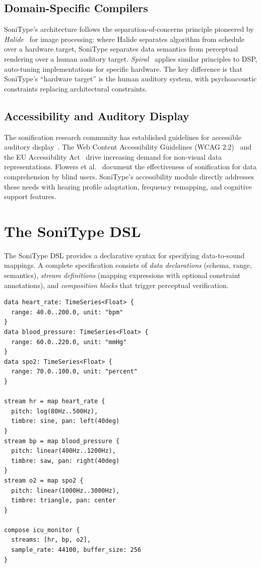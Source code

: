 \documentclass[sigchi, nonacm]{acmart}
\begin{document}
\subsection{Domain-Specific Compilers}

SoniType's architecture follows the separation-of-concerns principle pioneered by \emph{Halide}~\cite{ragan2013halide} for image processing: where Halide separates algorithm from schedule over a hardware target, SoniType separates data semantics from perceptual rendering over a human auditory target. \emph{Spiral}~\cite{puschel2005spiral} applies similar principles to DSP, auto-tuning implementations for specific hardware. The key difference is that SoniType's ``hardware target'' is the human auditory system, with psychoacoustic constraints replacing architectural constraints.

\subsection{Accessibility and Auditory Display}

The sonification research community has established guidelines for accessible auditory display~\cite{hermann2011sonification, walker2011theory}. The Web Content Accessibility Guidelines (WCAG 2.2)~\cite{wcag22} and the EU Accessibility Act~\cite{euaccessibility2019} drive increasing demand for non-visual data representations. Flowers et al.~\cite{flowers2005thirteen} document the effectiveness of sonification for data comprehension by blind users. SoniType's accessibility module directly addresses these needs with hearing profile adaptation, frequency remapping, and cognitive support features.

\section{The SoniType DSL}
\label{sec:dsl}

The SoniType DSL provides a declarative syntax for specifying data-to-sound mappings. A complete specification consists of \emph{data declarations} (schema, range, semantics), \emph{stream definitions} (mapping expressions with optional constraint annotations), and \emph{composition blocks} that trigger perceptual verification.

\begin{lstlisting}[caption={Three-stream ICU monitor specification.},label={lst:icu}]
data heart_rate: TimeSeries<Float> {
  range: 40.0..200.0, unit: "bpm"
}
data blood_pressure: TimeSeries<Float> {
  range: 60.0..220.0, unit: "mmHg"
}
data spo2: TimeSeries<Float> {
  range: 70.0..100.0, unit: "percent"
}

stream hr = map heart_rate {
  pitch: log(80Hz..500Hz),
  timbre: sine, pan: left(40deg)
}
stream bp = map blood_pressure {
  pitch: linear(400Hz..1200Hz),
  timbre: saw, pan: right(40deg)
}
stream o2 = map spo2 {
  pitch: linear(1000Hz..3000Hz),
  timbre: triangle, pan: center
}

compose icu_monitor {
  streams: [hr, bp, o2],
  sample_rate: 44100, buffer_size: 256
}
\end{lstlisting}
\end{document}

